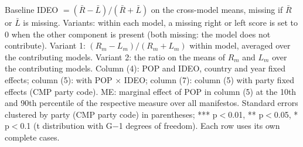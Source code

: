 \begin{table}[ht]
{\begin{tabular}{lrrrrrrrr}
\end{tabular}}
\par\smallskip
\begin{minipage}{\linewidth}\scriptsize Baseline IDEO $=(\bar R-\bar L)/(\bar R+\bar L)$ on the cross-model means, missing if $\bar R$ or $\bar L$ is missing. Variants: within each model, a missing right or left score is set to 0 when the other component is present (both missing: the model does not contribute). Variant 1: $(R_m-L_m)/(R_m+L_m)$ within model, averaged over the contributing models. Variant 2: the ratio on the means of $R_m$ and $L_m$ over the contributing models. Column (4): POP and IDEO, country and year fixed effects; column (5): with POP $\times$ IDEO; column (7): column (5) with party fixed effects (CMP party code). ME: marginal effect of POP in column (5) at the 10th and 90th percentile of the respective measure over all manifestos. Standard errors clustered by party (CMP party code) in parentheses; *** p$<$0.01, ** p$<$0.05, * p$<$0.1 (t distribution with G$-$1 degrees of freedom). Each row uses its own complete cases.\end{minipage}
\end{table}
